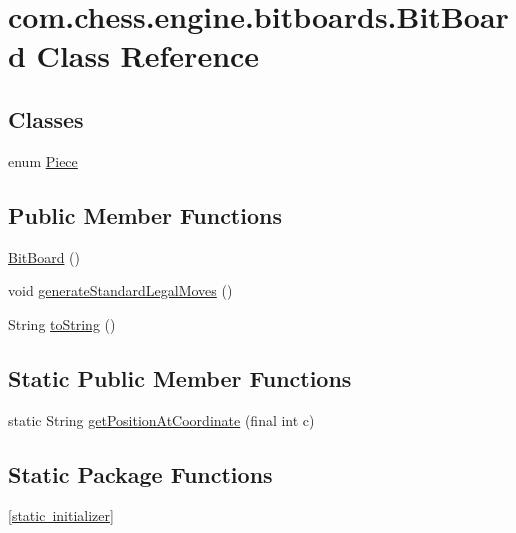 \hypertarget{classcom_1_1chess_1_1engine_1_1bitboards_1_1_bit_board}{}\section{com.\+chess.\+engine.\+bitboards.\+Bit\+Board Class Reference}
\label{classcom_1_1chess_1_1engine_1_1bitboards_1_1_bit_board}
\subsection*{Classes}
\begin{DoxyCompactItemize}
\item 
enum \mbox{\hyperlink{enumcom_1_1chess_1_1engine_1_1bitboards_1_1_bit_board_1_1_piece}{Piece}}
\end{DoxyCompactItemize}
\subsection*{Public Member Functions}
\begin{DoxyCompactItemize}
\item 
\mbox{\hyperlink{classcom_1_1chess_1_1engine_1_1bitboards_1_1_bit_board_afb76f345ee988535cb0b891fa90df3c0}{Bit\+Board}} ()
\item 
void \mbox{\hyperlink{classcom_1_1chess_1_1engine_1_1bitboards_1_1_bit_board_a2d779cb6eee4e38260a001253f06793d}{generate\+Standard\+Legal\+Moves}} ()
\item 
String \mbox{\hyperlink{classcom_1_1chess_1_1engine_1_1bitboards_1_1_bit_board_ae0882836b530b664fa2dcc05e1ce3c5c}{to\+String}} ()
\end{DoxyCompactItemize}
\subsection*{Static Public Member Functions}
\begin{DoxyCompactItemize}
\item 
static String \mbox{\hyperlink{classcom_1_1chess_1_1engine_1_1bitboards_1_1_bit_board_a9592ff2398f3d7c41ea8d9cd77a8df1a}{get\+Position\+At\+Coordinate}} (final int c)
\end{DoxyCompactItemize}
\subsection*{Static Package Functions}
\begin{DoxyCompactItemize}
\item 
\mbox{\hyperlink{classcom_1_1chess_1_1engine_1_1bitboards_1_1_bit_board_a952cb4f4649710e3bb3d452ea134daf6}{\mbox{[}static initializer\mbox{]}}}
\end{DoxyCompactItemize}
